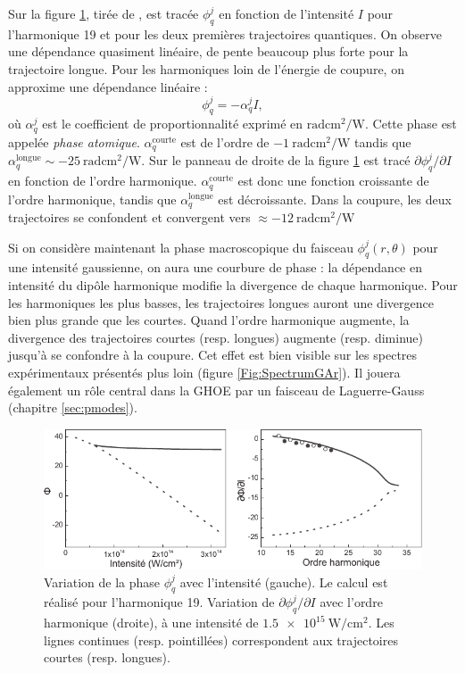 Sur la figure \ref{fig:varju}, tirée de , est tracée $\phi^j_q$ en fonction de l'intensité $I$ pour l'harmonique 19 et pour les deux premières trajectoires quantiques. On observe une dépendance quasiment linéaire, de pente beaucoup plus forte pour la trajectoire longue. Pour les harmoniques loin de l'énergie de coupure, on approxime une dépendance linéaire :
\begin{equation}
\phi^j_q = - \alpha_q^j I,
\label{eq:alphaI}
\end{equation}
où $\alpha_q^j$ est le coefficient de proportionnalité exprimé en $\si{\radian\cm\squared\per\W}$. Cette phase est appelée \textit{phase atomique}. $\alpha_q^{\text{courte}}$ est de l'ordre de $\SI{-1}{\radian\cm\squared\per\W}$ tandis que $\alpha_q^{\text{longue}}\sim\SI{-25}{\radian\cm\squared\per\W}$. Sur le panneau de droite de la figure \ref{fig:varju} est tracé $\partial\phi^j_q/\partial I$ en fonction de l'ordre harmonique. $\alpha_q^{\text{courte}}$ est donc une fonction croissante de l'ordre harmonique, tandis que $\alpha_q^{\text{longue}}$ est décroissante. Dans la coupure, les deux trajectoires se confondent et convergent vers $\approx \SI{-12}{\radian\cm\squared\per\W}$\par
Si on considère maintenant la phase macroscopique du faisceau $\phi^j_q(r,\theta)$ pour une intensité gaussienne, on aura une courbure de phase : la dépendance en intensité du dipôle harmonique modifie la divergence de chaque harmonique. Pour les harmoniques les plus basses, les trajectoires longues auront une divergence bien plus grande que les courtes. Quand l'ordre harmonique augmente, la divergence des trajectoires courtes (resp. longues) augmente (resp. diminue) jusqu'à se confondre à la coupure. Cet effet est bien visible sur les spectres expérimentaux présentés plus loin (figure \ref{Fig:SpectrumGAr}). Il jouera également un rôle central dans la GHOE par un faisceau de Laguerre-Gauss (chapitre \ref{sec:pmodes}).

\begin{figure}[!ht]
\centering
\includegraphics[width=1\columnwidth]{Figures/ThreeStep/alphaI_varju.pdf}%
\caption{Variation de la phase $\phi^j_q$ avec l'intensité (gauche). Le calcul est réalisé pour l'harmonique 19. Variation de $\partial\phi^j_q/\partial I$ avec l'ordre harmonique (droite), à une intensité de $\SI{1.5e15}{\W\per\cm\squared}$. Les lignes continues (resp. pointillées) correspondent aux trajectoires courtes (resp. longues).}
\label{fig:varju}
\end{figure}

